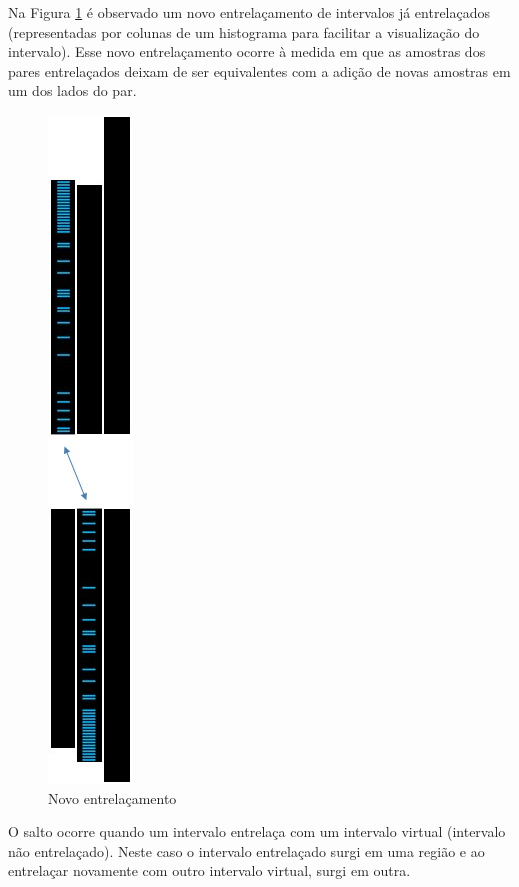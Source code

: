 Na Figura \ref{fig:consciousness_space_subconscious_observation_jump} é observado um novo entrelaçamento de intervalos já entrelaçados (representadas por colunas de um histograma para facilitar a visualização do intervalo). Esse novo entrelaçamento ocorre à medida em que as amostras dos pares entrelaçados deixam de ser equivalentes com a adição de novas amostras em um dos lados do par.
	\begin{figure}[H]
	\caption{Novo entrelaçamento}
	\label{fig:consciousness_space_subconscious_observation_jump}
	\centering
	\includegraphics[scale=.53]{sections/images/consciousness_space_subconscious_observation_jump.jpg}
	\end{figure}

O salto ocorre quando um intervalo entrelaça com um intervalo virtual (intervalo não entrelaçado). Neste caso o intervalo entrelaçado surgi em uma região e ao entrelaçar novamente com outro intervalo virtual, surgi em outra.

